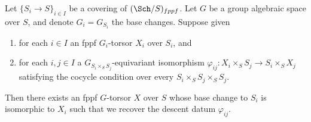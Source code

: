 \begin{lemma}
\label{lemma-descent-torsor}
Let $\{S_i \to S\}_{i \in I}$ be a covering of $(\Sch/S)_{fppf}$.
Let $G$ be a group algebraic space over $S$, and denote
$G_i = G_{S_i}$ the base changes. Suppose given
\begin{enumerate}
\item for each $i \in I$ an fppf $G_i$-torsor $X_i$ over $S_i$,
and
\item for each $i, j \in I$ a $G_{S_i \times_S S_j}$-equivariant isomorphism
$\varphi_{ij} : X_i \times_S S_j \to S_i \times_S X_j$ satisfying the cocycle
condition over every $S_i \times_S S_j \times_S S_j$.
\end{enumerate}
Then there exists an fppf $G$-torsor $X$ over $S$
whose base change to $S_i$ is isomorphic to $X_i$ such that we
recover the descent datum $\varphi_{ij}$.
\end{lemma}


